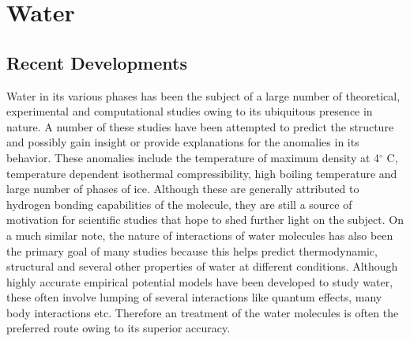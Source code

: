 \chapter{Water}
\label{chap:h2o}
\section{Recent Developments}
    \label{sec:introduction}
        Water in its various phases has been the subject of a large number of theoretical, experimental and computational studies owing to its ubiquitous presence in nature. A number of these studies have been attempted to predict the structure and possibly gain insight or provide explanations for the anomalies in its behavior. These anomalies include \cite{Szalewicz2009} the temperature of maximum density at 4$^\circ$ C, temperature dependent isothermal compressibility, high boiling temperature and large number of phases of ice. Although these are generally attributed to hydrogen bonding capabilities of the molecule, they are still a source of motivation for scientific studies that hope to shed further light on the subject. On a much similar note, the nature of interactions of water molecules has also been the primary goal of many studies because this helps predict thermodynamic, structural and several other properties of water at different conditions. Although highly accurate empirical potential models have been developed to study water, these often involve lumping of several interactions like quantum effects, many body interactions etc. Therefore an \abinitio{} treatment of the water molecules is often the preferred route owing to its superior accuracy.
